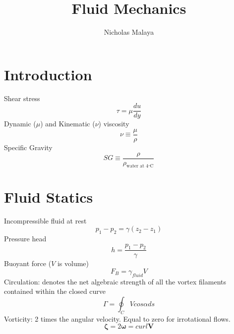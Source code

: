 \documentclass{article}
\title{\bf{Fluid Mechanics}}
\author{Nicholas Malaya} \date{}
\begin{document}
\maketitle


%
%
\newpage
\section{Introduction}

Shear stress
\begin{equation}
    \tau = \mu\frac{du}{dy}
\end{equation}
\newline
\newline
Dynamic ($\mu$) and Kinematic ($\nu$) viscosity
\begin{equation}
  \nu \equiv \frac{\mu}{\rho}
\end{equation}
\newline
\newline
Specific Gravity
\begin{equation}
  SG \equiv \frac{\rho}{\rho_\text{water at 4$^\circ$C}}
\end{equation}

%
%
\section{Fluid Statics}

Incompressible fluid at rest
\begin{equation}
    p_1-p_2 = \gamma (z_2-z_1)
\end{equation}
\newline
\newline
Pressure head
\begin{equation}
    h = \frac{p_1-p_2}{\gamma}
\end{equation}
\newline
\newline
Buoyant force ($V$ is volume)
\begin{equation}
    F_B = \gamma_{fluid} V
\end{equation}
\newline
\newline
Circulation: denotes the net algebraic strength of all the vortex filaments contained within the closed curve
\begin{equation}
  \Gamma = \oint_{C} Vcos\alpha ds
\end{equation}
\newline
\newline
Vorticity: 2 times the angular velocity. Equal to zero for irrotational flows.
\begin{equation}
  \mathbf{\zeta} = 2\mathbf{\omega} = curl\mathbf{V}
\end{equation}
\end{document}
